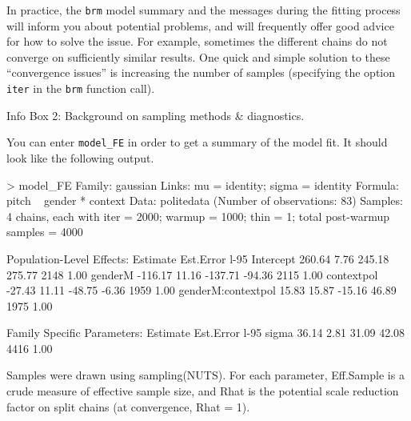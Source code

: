 \documentclass[nobib]{tufte-handout}
\begin{document}
\begin{InfoBox}[]
{\begin{minipage}{1\textwidth}
    \medskip
  
    In practice, the \texttt{brm} model summary and the messages during the fitting process will inform you about potential problems, and will frequently offer good advice for how to solve the issue. 
   For example, sometimes the different chains do not converge on sufficiently similar results. 
    One quick and simple solution to these ``convergence issues'' is increasing the number of samples (specifying the option \texttt{iter} in the \texttt{brm} function call).
   
  \end{minipage} \par
  } \par
  \begin{center}
    Info Box 2: Background on sampling methods \& diagnostics.
  \end{center}
\end{InfoBox}


You can enter \texttt{model\_FE} in order to get a summary of the model fit. It should look like the following output.

\bigskip

\begin{minipage}[]{1.2\textwidth}
\begin{rc}
> model_FE
 Family: gaussian 
  Links: mu = identity; sigma = identity 
Formula: pitch ~ gender * context 
   Data: politedata (Number of observations: 83) 
Samples: 4 chains, each with iter = 2000; warmup = 1000; thin = 1;
         total post-warmup samples = 4000

Population-Level Effects: 
                   Estimate Est.Error l-95%
Intercept            260.64      7.76   245.18   275.77       2148 1.00
genderM             -116.17     11.16  -137.71   -94.36       2115 1.00
contextpol           -27.43     11.11   -48.75    -6.36       1959 1.00
genderM:contextpol    15.83     15.87   -15.16    46.89       1975 1.00

Family Specific Parameters: 
      Estimate Est.Error l-95%
sigma    36.14      2.81    31.09    42.08       4416 1.00

Samples were drawn using sampling(NUTS). For each parameter, Eff.Sample 
is a crude measure of effective sample size, and Rhat is the potential 
scale reduction factor on split chains (at convergence, Rhat = 1).
\end{rc}
\end{minipage}
\end{document}
